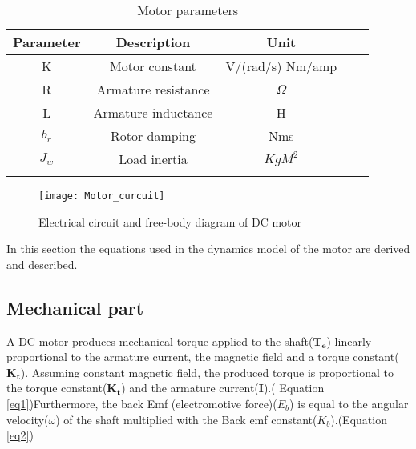 \begin{table}[h]
\centering
\begin{tabular}{cccll}
\hline
Parameter                   & Description                               & Unit				 &  &  \\ \hline
\multicolumn{1}{|c|}{K}     & \multicolumn{1}{c|}{Motor constant}       & \multicolumn{1}{c|}{ V/(rad/s)  Nm/amp} &  &  \\ \cline{1-3}
\multicolumn{1}{|c|}{R}     & \multicolumn{1}{c|}{Armature resistance}  & \multicolumn{1}{c|}{$\Omega$}            &  &  \\ \cline{1-3}
\multicolumn{1}{|c|}{L}     & \multicolumn{1}{c|}{Armature inductance}  & \multicolumn{1}{c|}{H}                    &  &  \\ \cline{1-3}
\multicolumn{1}{|c|}{$b_r$} & \multicolumn{1}{c|}{Rotor damping}        & \multicolumn{1}{c|}{Nms}                   &  &  \\ \cline{1-3}
\multicolumn{1}{|c|}{$J_w$} & \multicolumn{1}{c|}{Load inertia} & \multicolumn{1}{c|}{$KgM^2$}        &  &  \\ \cline{1-3}
\multicolumn{1}{l}{}        & \multicolumn{1}{l}{}                      & \multicolumn{1}{l}{}                          &  &  \\ \hline
\end{tabular}
\caption{Motor parameters}
\label{my-label}
\end{table}

\begin{figure}[h] %
\centering
\texttt{[image: Motor\_curcuit]}
\caption{Electrical circuit and free-body diagram of DC motor \cite{FBD}}
\label{fig::motor_curcuit}
\end{figure} 

In this section the equations used in the dynamics model of the motor are derived and described.

\subsection{Mechanical part}

A DC motor produces mechanical torque applied to the shaft($\boldsymbol{T_e}$) linearly proportional to the armature current, the magnetic field and a torque constant($\boldsymbol{K_t}$). Assuming constant magnetic field, the produced torque is proportional to the torque constant($\boldsymbol{K_t}$) and the armature current(\textbf{I}).( Equation \ref{eq1})Furthermore, the back Emf (electromotive force)($E_b$) is equal to the angular velocity($\omega$) of the shaft multiplied with the Back emf constant($K_b$).(Equation \ref{eq2}) \\

